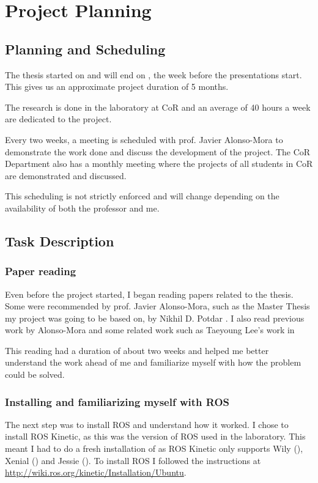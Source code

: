 \chapter{Project Planning}

\section{Planning and Scheduling}

The thesis started on  and will end on , the week before the presentations start. This gives us an approximate project duration of 5 months.

The research is done in the laboratory at \ac{CoR} and an average of 40 hours a week are dedicated to the project.

Every two weeks, a meeting is scheduled with prof. Javier Alonso-Mora to demonstrate the work done and discuss the development of the project. The \ac{CoR} Department also has a monthly meeting where the projects of all students in \ac{CoR} are demonstrated and discussed.

This scheduling is not strictly enforced and will change depending on the availability of both the professor and me.

\section{Task Description}

\subsection{Paper reading}
Even before the project started, I began reading papers related to the thesis. Some were recommended by prof. Javier Alonso-Mora, such as the Master Thesis my project was going to be based on, by Nikhil D. Potdar \cite{Potdar2018}. I also read previous work by Alonso-Mora \cite{Alonso-Mora2017,Alonso-mora} and some related work such as Taeyoung Lee's work in \cite{Lee2013,Lee2014}

This reading had a duration of about two weeks and helped me better understand the work ahead of me and familiarize myself with how the problem could be solved.

\subsection{Installing and familiarizing myself with \ac{ROS}}
The next step was to install \ac{ROS} and understand how it worked. I chose to install \ac{ROS} Kinetic, as this was the version of \ac{ROS} used in the laboratory. This meant I had to do a fresh installation of  as \ac{ROS} Kinetic only supports Wily (), Xenial () and Jessie (). To install \ac{ROS} I followed the instructions at \url{http://wiki.ros.org/kinetic/Installation/Ubuntu}.

